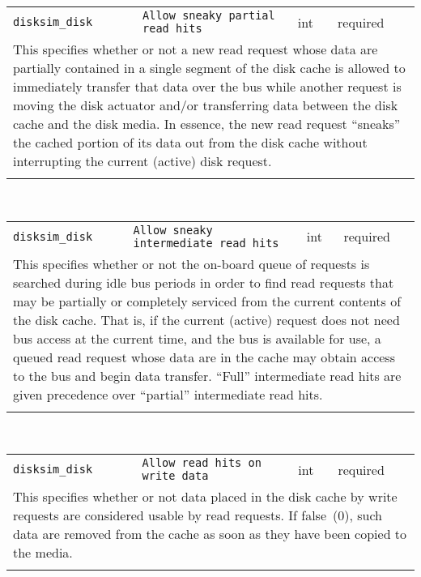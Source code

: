 \noindent 
\begin{tabular}{|p{1.5in}|p{3.5in}|p{0.5in}|p{0.5in}|}
\cline{1-4}
\texttt{disksim\_disk} & \texttt{Allow sneaky partial read hits} & int & required \\ 
\cline{1-4}
\multicolumn{4}{|p{6in}|}{
This specifies whether or not a new read request whose data are partially
contained in a single segment of the disk cache is allowed to
immediately transfer that data over the bus while another request is
moving the disk actuator and/or transferring data between the disk
cache and the disk media. In essence, the new read request ``sneaks''
the cached portion of its data out from the disk cache without
interrupting the current (active) disk request.
}\\ 
\cline{1-4}
\multicolumn{4}{p{5in}}{}\\
\end{tabular}\\ 
\noindent 
\begin{tabular}{|p{1.5in}|p{3.5in}|p{0.5in}|p{0.5in}|}
\cline{1-4}
\texttt{disksim\_disk} & \texttt{Allow sneaky intermediate read hits} & int & required \\ 
\cline{1-4}
\multicolumn{4}{|p{6in}|}{
This specifies whether or not the on-board queue of requests is searched
during idle bus periods in order to find read requests that may be
partially or completely serviced from the current contents of the disk
cache. That is, if the current (active) request does not need bus
access at the current time, and the bus is available for use, a queued
read request whose data are in the cache may obtain access to the bus
and begin data transfer. ``Full'' intermediate read hits are given
precedence over ``partial'' intermediate read hits.
}\\ 
\cline{1-4}
\multicolumn{4}{p{5in}}{}\\
\end{tabular}\\ 
\noindent 
\begin{tabular}{|p{1.5in}|p{3.5in}|p{0.5in}|p{0.5in}|}
\cline{1-4}
\texttt{disksim\_disk} & \texttt{Allow read hits on write data} & int & required \\ 
\cline{1-4}
\multicolumn{4}{|p{6in}|}{
This specifies whether or not data placed in the disk cache by write
requests are considered usable by read requests. If false~(0), such
data are removed from the cache as soon as they have been copied to
the media.
}\\ 
\cline{1-4}
\multicolumn{4}{p{5in}}{}\\
\end{tabular}\\ 

